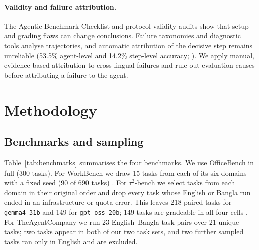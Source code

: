 \documentclass[11pt]{article}
\newif\ifshowverify
\newcommand{\verify}[1]{\ifshowverify{\color{red}\,[VERIFY: #1]}\fi}
\newcommand{\gemma}{\texttt{gemma4-31b}}
\newcommand{\gptoss}{\texttt{gpt-oss-20b}}
\newcommand{\OB}{OfficeBench}
\newcommand{\WB}{WorkBench}
\newcommand{\TAU}{$\tau^2$-bench}
\newcommand{\TAC}{TheAgentCompany}
\begin{document}
\paragraph{Validity and failure attribution.} The Agentic Benchmark Checklist
\citep{zhu2025abc} and protocol-validity audits \citep{shao2026protocol} show that setup and
grading flaws can change conclusions. Failure taxonomies \citep{cemri2025mast} and diagnostic
tools \citep{barke2026agentrx} analyse trajectories, and automatic attribution of the decisive
step remains unreliable (53.5\% agent-level and 14.2\% step-level accuracy;
\citealp{zhang2025whichagent}). We apply manual, evidence-based attribution to cross-lingual
failures and rule out evaluation causes before attributing a failure to the agent.

\section{Methodology}
\label{sec:method}

\subsection{Benchmarks and sampling}
Table~\ref{tab:benchmarks} summarises the four benchmarks. We use \OB{} in full (300 tasks).
For \WB{} we draw 15 tasks from each of its six domains with a fixed seed (90 of 690 tasks)
\verify{seed value}. For \TAU{} we select tasks from each domain in their original order and drop
every task whose English or Bangla run ended in an infrastructure or quota error. This leaves 218
paired tasks for \gemma{} and 149 for \gptoss{}; 149 tasks are gradeable in all four cells
\verify{the draft's Table~1 gives 149 tasks for \TAU{}; the number of tasks sampled before
exclusions is not recorded in the sources}. For \TAC{} we run 23 English--Bangla task pairs over 21
unique tasks; two tasks appear in both of our two task sets, and two further sampled tasks ran only
in English and are excluded.
\end{document}
